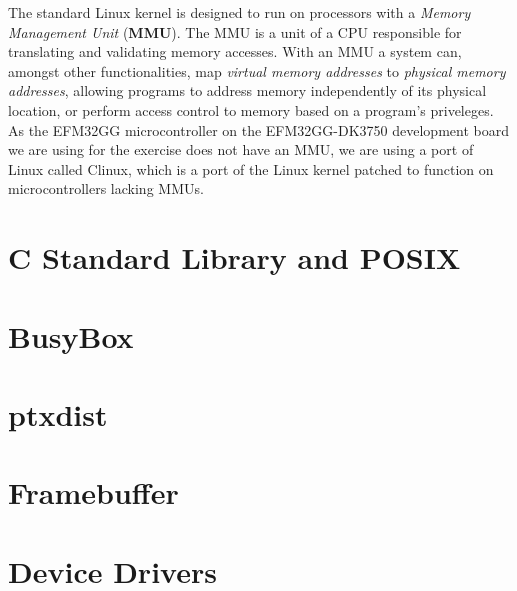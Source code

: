 The standard Linux kernel is designed to run on processors with a \emph{Memory
Management Unit} (\textbf{MMU}). The MMU is a unit of a CPU responsible for
translating and validating memory accesses. With an MMU a system can, amongst
other functionalities, map \emph{virtual memory addresses} to \emph{physical
memory addresses}, allowing programs to address memory independently of its
physical location, or perform access control to memory based on a program's
priveleges. As the EFM32GG microcontroller on the EFM32GG-DK3750 development
board we are using for the exercise does not have an MMU, we are using a port of
Linux called \textmu Clinux, which is a port of the Linux kernel patched to
function on microcontrollers lacking MMUs.

\section{C Standard Library and POSIX}

\section{BusyBox}

\section{ptxdist}

\section{Framebuffer}

\section{Device Drivers}
